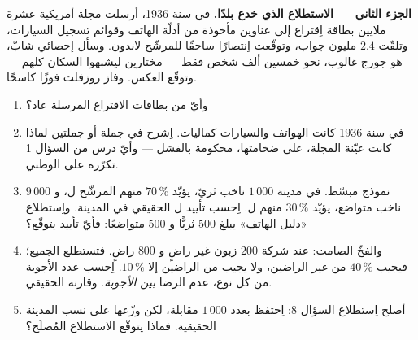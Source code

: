 \begin{problem}
\medskip
\noindent\textbf{الجزء الثاني --- الاستطلاع الذي خدع بلدًا.}
في سنة 1936، أرسلت مجلة أمريكية عشرة ملايين بطاقة اِقتراع إلى
عناوين مأخوذة من أدلّة الهاتف وقوائم تسجيل
السيارات، وتلقّت $2.4$ مليون جواب، وتوقّعت اِنتصارًا
ساحقًا للمرشّح لاندون. وسأل إحصائي شابّ، هو جورج
غالوب، نحو خمسين ألف شخص فقط --- مختارين ليشبهوا
السكان كلهم --- وتوقّع العكس.
وفاز روزفلت فوزًا كاسحًا.
\begin{enumerate}[resume]
  \item وأيّ  من بطاقات الاقتراع المرسلة عاد؟
  \item في سنة 1936 كانت الهواتف والسيارات كماليات. اِشرح في
        جملة أو جملتين لماذا كانت عيّنة المجلة، على
        ضخامتها، محكومة بالفشل --- وأيّ درس من السؤال 1
        تكرّره على  الوطني.
  \item نموذج مبسّط. في مدينة $1\,000$ ناخب ثريّ، يؤيّد
        $70\,\%$ منهم المرشّح ل، و $9\,000$ ناخب متواضع، يؤيّد
        $30\,\%$ منهم ل. اِحسب تأييد ل الحقيقي في
        المدينة. واِستطلاع «دليل الهاتف» يبلغ $500$ ثريًّا
        و $500$ متواضعًا: فأيّ تأييد يتوقّع؟
  \item والفخّ الصامت: عند شركة $200$ زبون غير راضٍ
        و $800$ راضٍ. فتستطلع الجميع؛ فيجيب $40\,\%$ من
        غير الراضين، ولا يجيب من الراضين إلا $10\,\%$.
        اِحسب عدد الأجوبة من كل نوع، 
        عدم الرضا \emph{بين الأجوبة}.
        وقارنه  الحقيقي.
  \item أصلح اِستطلاع السؤال 8: اِحتفظ بعدد $1\,000$
        مقابلة، لكن وزّعها على نسب المدينة
        الحقيقية. فماذا يتوقّع الاستطلاع المُصلَح؟
\end{enumerate}


\end{problem}
